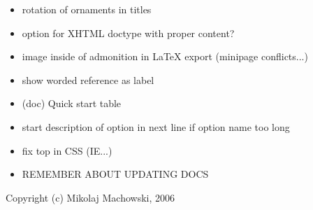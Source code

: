 \documentclass[12pt]{article}
\begin{document}
\begin{itemize}
\item
rotation of ornaments in titles

\item
option for XHTML doctype with proper content?

\item
image inside of admonition in \LaTeX{} export (minipage conflicts...)

\item
show worded reference as label

\item
(doc) Quick start table

\item
start description of option in next line if option name too long

\item
fix \hypertarget{ltop}{top} in CSS (IE...)
\end{itemize}
\begin{itemize}
\item
REMEMBER ABOUT UPDATING DOCS
\end{itemize}

Copyright (c) Mikolaj Machowski, 2006

\end{document}
